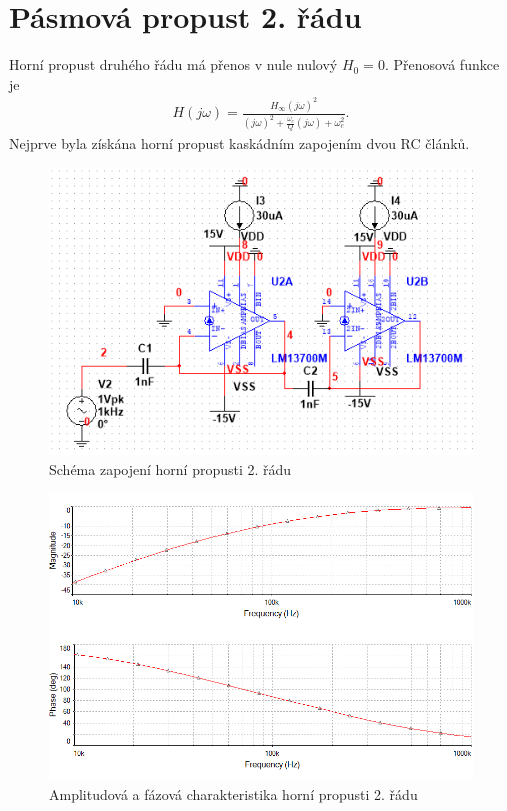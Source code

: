 \documentclass[twoside]{article}
\begin{document}
\section{Pásmová propust 2. řádu}
Horní propust druhého řádu má přenos v nule nulový $H_{0} = 0$. Přenosová funkce je
\begin{align}
H(j\omega) = \frac{H_{\infty} (j\omega) ^2}{(j\omega)^2 + \frac{\omega _c}{Q}(j\omega) + \omega _c ^2}.
\end{align}
\noindent Nejprve byla získána horní propust kaskádním zapojením dvou RC článků.
\begin{figure}[H]
\centering
\includegraphics[scale=0.75]{1606.png}
\caption{Schéma zapojení horní propusti 2. řádu}
\end{figure}
\begin{figure}[H]
\centering
\includegraphics[scale=0.75]{16063.png}
\caption{Amplitudová a fázová charakteristika horní propusti 2. řádu}
\end{figure}
\end{document}
